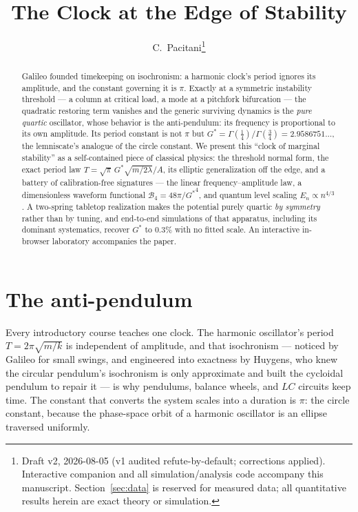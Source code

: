 \documentclass[11pt,a4paper]{article}
\title{\bfseries The Clock at the Edge of Stability}
\author{C.~Pacitani\thanks{Draft v2, 2026-08-05 (v1 audited refute-by-default;
corrections applied). Interactive companion and all simulation/analysis code
accompany this manuscript. Section~\ref{sec:data} is reserved for measured
data; all quantitative results herein are exact theory or simulation.}}
\date{}
\newcommand{\Gstar}{{G^{*}}}
\begin{document}
\maketitle

\begin{abstract}
Galileo founded timekeeping on isochronism: a harmonic clock's period ignores
its amplitude, and the constant governing it is $\pi$. Exactly at a symmetric
instability threshold --- a column at critical load, a mode at a pitchfork
bifurcation --- the quadratic restoring term vanishes and the generic surviving
dynamics is the \emph{pure quartic} oscillator, whose behavior is the
anti-pendulum: its frequency is proportional to its own amplitude. Its period
constant is not $\pi$ but $\Gstar=\Gamma(\tfrac14)/\Gamma(\tfrac34)=
2.9586751\ldots$, the lemniscate's analogue of the circle constant. We present
this ``clock of marginal stability'' as a self-contained piece of classical
physics: the threshold normal form, the exact period law
$T=\sqrt{\pi}\,\Gstar\sqrt{m/2\lambda}/A$, its elliptic generalization off the
edge, and a battery of calibration-free signatures --- the linear
frequency--amplitude law, a dimensionless waveform functional
$\mathcal B_4=48\pi/\Gstar^{4}$, and quantum level scaling
$E_n\propto n^{4/3}$. A two-spring tabletop realization makes the potential
purely quartic \emph{by symmetry} rather than by tuning, and end-to-end
simulations of that apparatus, including its dominant systematics, recover
$\Gstar$ to $0.3\%$ with no fitted scale. An interactive in-browser laboratory
accompanies the paper.
\end{abstract}

\section{The anti-pendulum}
\label{sec:intro}

Every introductory course teaches one clock. The harmonic oscillator's period
$T=2\pi\sqrt{m/k}$ is independent of amplitude, and that isochronism ---
noticed by Galileo for small swings, and engineered into exactness by Huygens,
who knew the circular pendulum's isochronism is only approximate and built the
cycloidal pendulum to repair it \cite{huygens} --- is why pendulums, balance
wheels, and $LC$ circuits keep time. The constant that converts the system
scales into a duration is $\pi$: the circle constant, because the phase-space
orbit of a harmonic oscillator is an ellipse traversed uniformly.
\end{document}
